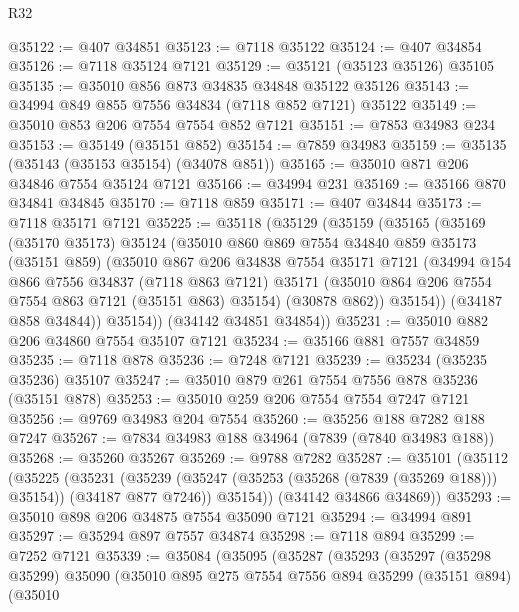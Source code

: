 \begin{lexlean}{R32}
\begin{coremodule}
@35122 := @407 @34851
@35123 := @7118 @35122
@35124 := @407 @34854
@35126 := @7118 @35124 @7121
@35129 := @35121 (@35123 @35126) @35105
@35135 := @35010 @856 @873 @34835 @34848 @35122 @35126
@35143 := @34994 @849 @855 @7556 @34834 (@7118 @852 @7121) @35122
@35149 := @35010 @853 @206 @7554 @7554 @852 @7121
@35151 := @7853 @34983 @234
@35153 := @35149 (@35151 @852)
@35154 := @7859 @34983
@35159 := @35135 (@35143 (@35153 @35154) (@34078 @851))
@35165 := @35010 @871 @206 @34846 @7554 @35124 @7121
@35166 := @34994 @231
@35169 := @35166 @870 @34841 @34845
@35170 := @7118 @859
@35171 := @407 @34844
@35173 := @7118 @35171 @7121
@35225 := @35118
    (@35129
      (@35159
        (@35165
          (@35169
            (@35170 @35173)
            @35124
            (@35010
              @860
              @869
              @7554
              @34840
              @859
              @35173
              (@35151 @859)
              (@35010
                @867
                @206
                @34838
                @7554
                @35171
                @7121
                (@34994
                  @154
                  @866
                  @7556
                  @34837
                  (@7118 @863 @7121)
                  @35171
                  (@35010 @864 @206 @7554 @7554 @863 @7121 (@35151 @863) @35154)
                  (@30878 @862))
                @35154))
            (@34187 @858 @34844))
          @35154))
      (@34142 @34851 @34854))
@35231 := @35010 @882 @206 @34860 @7554 @35107 @7121
@35234 := @35166 @881 @7557 @34859
@35235 := @7118 @878
@35236 := @7248 @7121
@35239 := @35234 (@35235 @35236) @35107
@35247 := @35010 @879 @261 @7554 @7556 @878 @35236 (@35151 @878)
@35253 := @35010 @259 @206 @7554 @7554 @7247 @7121
@35256 := @9769 @34983 @204 @7554
@35260 := @35256 @188 @7282 @188 @7247
@35267 := @7834 @34983 @188 @34964 (@7839 (@7840 @34983 @188))
@35268 := @35260 @35267
@35269 := @9788 @7282
@35287 := @35101
    (@35112
      (@35225
        (@35231
          (@35239 (@35247 (@35253 (@35268 (@7839 (@35269 @188))) @35154)) (@34187 @877 @7246))
          @35154))
      (@34142 @34866 @34869))
@35293 := @35010 @898 @206 @34875 @7554 @35090 @7121
@35294 := @34994 @891
@35297 := @35294 @897 @7557 @34874
@35298 := @7118 @894
@35299 := @7252 @7121
@35339 := @35084
    (@35095
      (@35287
        (@35293
          (@35297
            (@35298 @35299)
            @35090
            (@35010
              @895
              @275
              @7554
              @7556
              @894
              @35299
              (@35151 @894)
              (@35010

\end{coremodule}
\end{lexlean}
